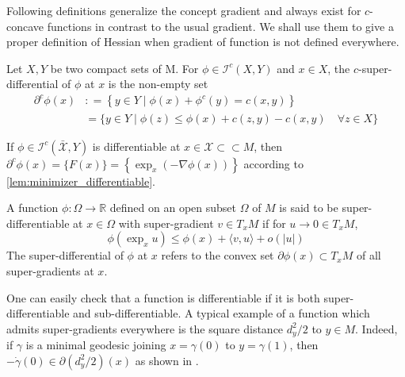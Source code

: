 Following definitions generalize the concept gradient and
always exist for $c$-concave functions in contrast to the usual gradient.
We shall use them to give a proper definition of Hessian when gradient of
function is not defined everywhere.

\begin{defn}
	Let \( X , Y \) be two compact sets of M. For \( \phi \in \mathcal { I } ^ { c } ( X , Y ) \)
	and \( x \in X \), the \( c \)-super-differential of \( \phi \) at \( x \) is the non-empty set
	\begin{align}
		\partial ^ { c } \phi ( x ) & : = \left\{ y \in Y \mid \phi ( x ) + \phi ^ { c } ( y ) = c ( x , y ) \right\}                   \\
		                            & = \{ y \in Y \mid \phi ( z ) \leq \phi ( x ) + c ( z , y ) - c ( x , y ) \quad \forall z \in X \}
		\label{equa:c-super-differential}
	\end{align}
\end{defn}

\begin{example} 
	\label{example:minimizer_differentiable}
	If \( \phi \in \mathcal { I } ^ { c } ( \bar {\mathcal{X} } , Y ) \) is differentiable at
	\( x \in \mathcal { X } \subset \subset M \),
	then \( \partial ^ { c } \phi ( x ) = \{ F ( x ) \} = \left\{ \exp _ { x } ( - \nabla \phi ( x ) ) \right\} \) according to \cref{lem:minimizer_differentiable}.
\end{example}

\begin{defn}
	A function \( \phi : \Omega \rightarrow \mathbb { R } \) defined on an open subset \( \Omega \) of \( M \)
	is said to be super-differentiable at \( x \in \Omega \) with super-gradient \( v \in T _ { x } M \) if for
	\( u \rightarrow 0 \in T _ { x } M \),
	\begin{equation}
		\label{equa:super-differential}
		\phi \left( \exp _ { x } u \right) \leq \phi ( x ) + \langle v , u \rangle + o ( | u | )
	\end{equation}
	The super-differential of \( \phi \) at \( x \) refers to the convex set \( \partial \phi ( x ) \subset T _ { x } M \) of all
	super-gradients at \( x \).
\end{defn}

One can easily check that a function is differentiable if it is both
super-differentiable and sub-differentiable.
A typical example of a function which admits super-gradients everywhere
is the square distance \( d _ { y } ^ { 2 } / 2 \) to \( y \in M \).
Indeed, if \( \gamma \) is a minimal geodesic
joining \( x = \gamma ( 0 ) \) to \( y = \gamma ( 1 ) \),
then \( - \dot { \gamma } ( 0 ) \in \partial \left( d _ { y } ^ { 2 } / 2 \right) ( x ) \)  as shown in \cite[Proposition 7]{mccann2001polar}.

